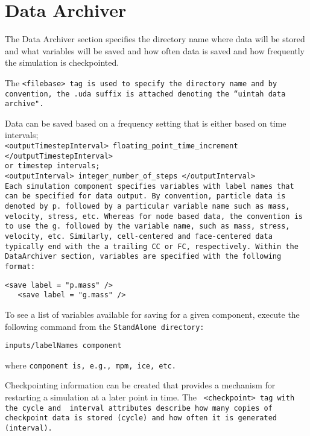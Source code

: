\section{Data Archiver} \label{Sec:DataArchiver}

The Data Archiver section specifies the directory name where data will
be stored and what variables will be saved and how often data is saved
and how frequently the simulation is checkpointed.

The \tt <filebase> \normalfont tag is used to specify the directory
name and by convention, the \tt .uda \normalfont suffix is attached denoting the
``uintah data archive".

Data can be saved based on a frequency setting that is either based on time
intervals;\\
\tt <outputTimestepInterval> floating\_point\_time\_increment </outputTimestepInterval> \normalfont\\
or timestep intervals; \\
\tt <outputInterval> integer\_number\_of\_steps </outputInterval> \normalfont\\

Each simulation component specifies variables with label names that
can be specified for data output.  By convention, particle data is
denoted by \tt p. \normalfont followed by a particular variable name
such as mass, velocity, stress, etc.  Whereas for node based data, the
convention is to use the \tt g. \normalfont followed by the variable
name, such as mass, stress, velocity, etc.  Similarly, cell-centered
and face-centered data typically end with the a trailing \tt CC \normalfont
or \tt FC, \normalfont  respectively.  Within the DataArchiver
section, variables are specified with the following format:

\begin{Verbatim}[fontsize=\footnotesize]
   <save label = "p.mass" />
   <save label = "g.mass" />
\end{Verbatim}

To see a list of
variables available for saving for a given component, execute the following
command from the \tt StandAlone \normalfont directory:

\begin{Verbatim}[fontsize=\footnotesize]
inputs/labelNames component
\end{Verbatim}
where \tt component \normalfont is, e.g., \tt mpm, \normalfont \tt ice, \normalfont etc.

Checkpointing information can be created that provides a mechanism for
restarting a simulation at a later point in time.  The \tt
<checkpoint> \normalfont tag with the \tt cycle \normalfont and \tt
interval \normalfont attributes describe how many copies of checkpoint
data is stored (cycle)  and how often it is generated (interval).

